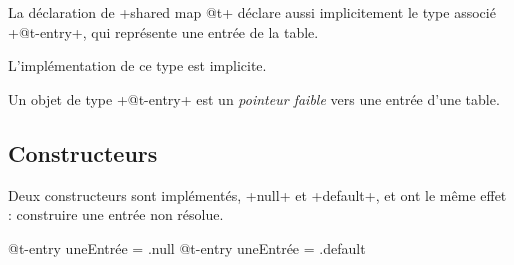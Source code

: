 
La déclaration de \ggs+shared map @t+ déclare aussi implicitement le type associé \ggs+@t-entry+, qui représente une entrée de la table.

L'implémentation de ce type est implicite.

Un objet de type \ggs+@t-entry+ est un \emph{pointeur faible} vers une entrée d'une table.




\subsection{Constructeurs}

Deux constructeurs sont implémentés, \ggs+null+ et  \ggs+default+, et ont le même effet : construire une entrée non résolue.

\begin{galgas}
  @t-entry uneEntrée = .null
  @t-entry uneEntrée = .default
\end{galgas}


